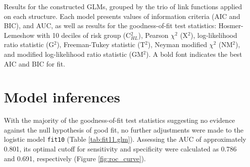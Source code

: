 \begin{table}[H]
\centering
\caption[Comparison and goodness-of-fit results for all constructed GLMs]{Results for the constructed GLMs, grouped by the trio of link functions applied on each structure. Each model presents values of information criteria (AIC and BIC), and AUC, as well as results for the goodness-of-fit test statistics: Hosmer-Lemeshow with 10 deciles of risk group (C$_{HL}^{2}$), Pearson $\chi^{2}$ (X$^{2}$), log-likelihood ratio statistic (G$^{2}$), Freeman-Tukey statistic (T$^{2}$), Neyman modified $\chi^{2}$ (NM$^{2}$), and modified log-likelihood ratio statistic (GM$^{2}$). A bold font indicates the best AIC and BIC for fit.}
\begin{adjustbox}{width=\linewidth}
\label{tab:glm.comparison}

\end{adjustbox}
\end{table}


\section{Model inferences}

With the majority of the goodness-of-fit test statistics suggesting no evidence against the null hypothesis of good fit, no further adjustments were made to the logistic model \texttt{fit10} (Table \ref{tab:fit11.glm}).
Assessing the AUC of approximately 0.801, its optimal cutoff for sensitivity and specificity were calculated as 0.786 and 0.691, respectively (Figure \ref{fig:roc_curve}).
\\

